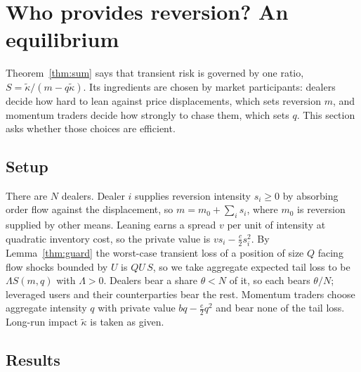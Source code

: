 \section{Who provides reversion? An equilibrium}\label{sec:equil}

Theorem~\ref{thm:sum} says that transient risk is governed by one ratio, $S=\tilde\kappa/(m-q\tilde\kappa)$. Its ingredients are chosen by market participants: dealers decide how hard to lean against price displacements, which sets reversion $m$, and momentum traders decide how strongly to chase them, which sets $q$. This section asks whether those choices are efficient.

\subsection{Setup}
There are $N$ dealers. Dealer $i$ supplies reversion intensity $s_i\ge0$ by absorbing order flow against the displacement, so $m=m_0+\sum_is_i$, where $m_0$ is reversion supplied by other means. Leaning earns a spread $v$ per unit of intensity at quadratic inventory cost, so the private value is $vs_i-\tfrac c2s_i^2$. By Lemma~\ref{thm:guard} the worst-case transient loss of a position of size $Q$ facing flow shocks bounded by $U$ is $QU\,S$, so we take aggregate expected tail loss to be $\Lambda S(m,q)$ with $\Lambda>0$. Dealers bear a share $\theta<N$ of it, so each bears $\theta/N$; leveraged users and their counterparties bear the rest. Momentum traders choose aggregate intensity $q$ with private value $bq-\tfrac e2q^2$ and bear none of the tail loss. Long-run impact $\tilde\kappa$ is taken as given.

\subsection{Results}

